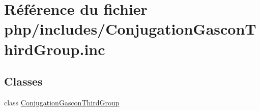 \hypertarget{_conjugation_gascon_third_group_8inc}{}\section{Référence du fichier php/includes/\+Conjugation\+Gascon\+Third\+Group.inc}
\label{_conjugation_gascon_third_group_8inc}
\subsection*{Classes}
\begin{DoxyCompactItemize}
\item 
class \hyperlink{class_conjugation_gascon_third_group}{Conjugation\+Gascon\+Third\+Group}
\end{DoxyCompactItemize}
